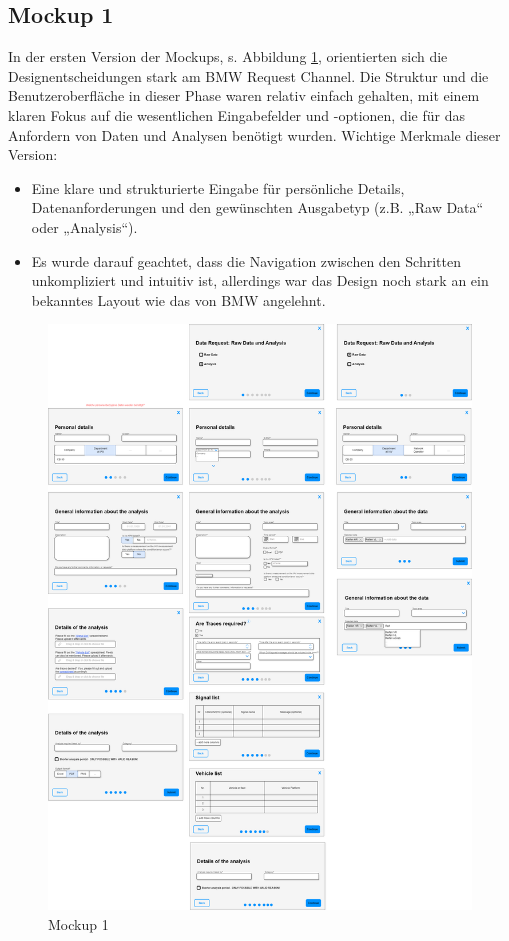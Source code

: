 \subsection*{Mockup 1}
In der ersten Version der Mockups, s. Abbildung \ref{fig:MockUps1.0}, orientierten sich die Designentscheidungen stark am BMW Request Channel. Die Struktur und die Benutzeroberfläche in dieser Phase waren relativ einfach gehalten, mit einem klaren Fokus auf die wesentlichen Eingabefelder und -optionen, die für das Anfordern von Daten und Analysen benötigt wurden.
\newline
Wichtige Merkmale dieser Version:
\begin{itemize}
    \item Eine klare und strukturierte Eingabe für persönliche Details, Datenanforderungen und den gewünschten Ausgabetyp (z.B. „Raw Data“ oder „Analysis“).
    \item Es wurde darauf geachtet, dass die Navigation zwischen den Schritten unkompliziert und intuitiv ist, allerdings war das Design noch stark an ein bekanntes Layout wie das von BMW angelehnt.
\end{itemize}
\begin{figure}[H]
    \centering
    \includegraphics[scale=.2]{media/MockUps1.0}
    \caption{Mockup 1}
    \label{fig:MockUps1.0}
\end{figure}
